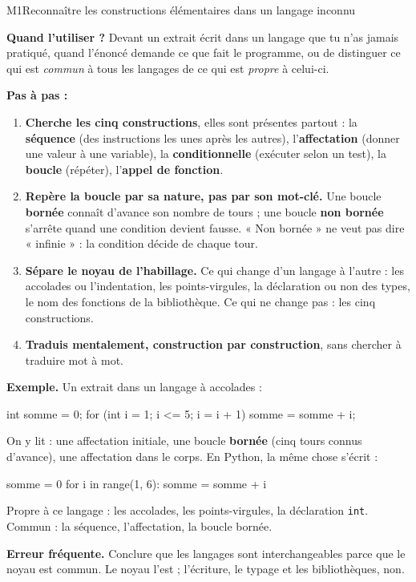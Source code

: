\begin{fichemethode}{M1}{Reconnaître les constructions élémentaires dans un langage inconnu}

\textbf{Quand l'utiliser ?} Devant un extrait écrit dans un langage que tu n'as jamais
pratiqué, quand l'énoncé demande ce que fait le programme, ou de distinguer ce qui est
\emph{commun} à tous les langages de ce qui est \emph{propre} à celui-ci.

\textbf{Pas à pas :}
\begin{enumerate}
  \item \textbf{Cherche les cinq constructions}, elles sont présentes partout :
        la \textbf{séquence} (des instructions les unes après les autres),
        l'\textbf{affectation} (donner une valeur à une variable),
        la \textbf{conditionnelle} (exécuter selon un test),
        la \textbf{boucle} (répéter),
        l'\textbf{appel de fonction}.
  \item \textbf{Repère la boucle par sa nature, pas par son mot-clé.} Une boucle
        \textbf{bornée} connaît d'avance son nombre de tours ; une boucle
        \textbf{non bornée} s'arrête quand une condition devient fausse. « Non bornée »
        ne veut pas dire « infinie » : la condition décide de chaque tour.
  \item \textbf{Sépare le noyau de l'habillage.} Ce qui change d'un langage à l'autre :
        les accolades ou l'indentation, les points-virgules, la déclaration ou non des types,
        le nom des fonctions de la bibliothèque. Ce qui ne change pas : les cinq constructions.
  \item \textbf{Traduis mentalement, construction par construction}, sans chercher à traduire
        mot à mot.
\end{enumerate}

\textbf{Exemple.} Un extrait dans un langage à accolades :
\begin{console}
int somme = 0;
for (int i = 1; i <= 5; i = i + 1) {
    somme = somme + i;
}
\end{console}

On y lit : une affectation initiale, une boucle \textbf{bornée} (cinq tours connus d'avance),
une affectation dans le corps. En Python, la même chose s'écrit :

\begin{python}
somme = 0
for i in range(1, 6):
    somme = somme + i
\end{python}

Propre à ce langage : les accolades, les points-virgules, la déclaration \lstinline{int}.
Commun : la séquence, l'affectation, la boucle bornée.

\textbf{Erreur fréquente.} Conclure que les langages sont interchangeables parce que le noyau
est commun. Le noyau l'est ; l'écriture, le typage et les bibliothèques, non.

\end{fichemethode}
